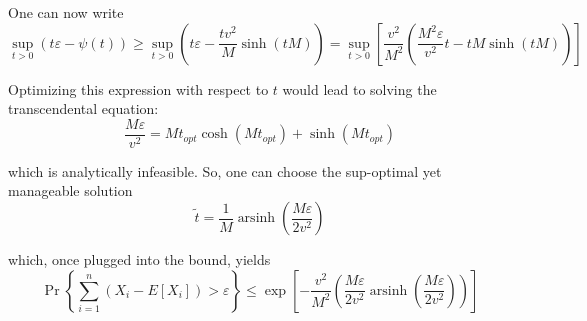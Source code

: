 \documentclass[12pt]{article}
\DeclareMathOperator{\arsinh}{arsinh}
\begin{document}
One can now write
\[
\sup_{t>0}\left( t\varepsilon -\psi (t)\right) \geq \sup_{t>0}\left(
t\varepsilon -\frac{tv^{2}}{M}\sinh \left( tM\right) \right) =\sup_{t>0}%
\left[ \frac{v^{2}}{M^{2}}\left( \frac{M^{2}\varepsilon }{v^{2}}t-tM\sinh
\left( tM\right) \right) \right] 
\]

Optimizing this expression with respect to $t$ would lead to solving the
transcendental equation:
\[
\frac{M\varepsilon }{v^{2}}=Mt_{opt}\cosh \left( Mt_{opt}\right) +\sinh
\left( Mt_{opt}\right) 
\]

which is analytically infeasible. So, one can choose the sup-optimal yet
manageable solution
\[
\widetilde{t}=\frac{1}{M}\arsinh\left( \frac{M\varepsilon }{2v^{2}}\right) 
\]

which, once plugged into the bound, yields
\[
\Pr\left\{ \sum_{i=1}^{n}\left( X_{i}-E[X_{i}]\right) >\varepsilon \right\}
\leq \exp \left[ -\frac{v^{2}}{M^{2}}\left( \frac{M\varepsilon }{2v^{2}}%
\arsinh\left( \frac{M\varepsilon }{2v^{2}}\right) \right) \right] 
\]
\end{document}
